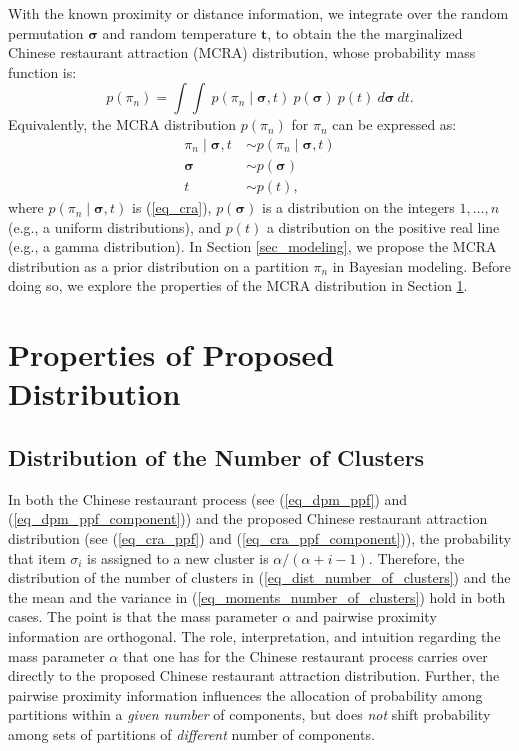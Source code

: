 \documentclass[lineno]{biometrika-dbd}
\newcommand{\partition}{\ensuremath{\pi}}
\newcommand{\mass}{\alpha}
\newcommand{\given}{\mid}
\begin{document}
With the known proximity or distance information, we integrate over the random
permutation $\bm{\sigma}$ and random temperature $\bm{t}$, to obtain the the
marginalized Chinese restaurant attraction (MCRA) distribution, whose
probability mass function is:
\begin{equation}
\label{eq_mcra}
p(\partition_n) = \int \int \ p(\partition_n \given \bm{\sigma}, t ) \ p(\bm{\sigma}) \ p(t) \ d \bm{\sigma} \ d t.
\end{equation}
Equivalently, the MCRA distribution $p(\partition_n)$ for $\partition_n$ can be expressed as: 
\begin{equation}
\label{eq_bnp_dpm}
\begin{split}
\partition_n \given \bm{\sigma}, t \ & \sim p(\partition_n \given \bm{\sigma}, t) \\
\bm{\sigma} & \sim p(\bm{\sigma}) \\
t & \sim p(t),
\end{split}
\end{equation}
where $p(\partition_n \mid \bm{\sigma}, t)$ is (\ref{eq_cra}), $p(\bm{\sigma})$
is a distribution on the integers $1,\ldots,n$ (e.g., a uniform distributions),
and $p(t)$ a distribution on the positive real line (e.g., a gamma
distribution).  In Section \ref{sec_modeling}, we propose the MCRA distribution
as a prior distribution on a partition $\partition_n$ in Bayesian modeling.
Before doing so, we explore the properties of the MCRA distribution in Section
\ref{sec_properties}.

\section{Properties of Proposed Distribution}
\label{sec_properties}

\subsection{Distribution of the Number of Clusters}
\label{sec_dist_number_of_clusters}

In both the Chinese restaurant process (see (\ref{eq_dpm_ppf}) and
(\ref{eq_dpm_ppf_component})) and the proposed Chinese restaurant attraction
distribution (see (\ref{eq_cra_ppf}) and (\ref{eq_cra_ppf_component})), the
probability that item $\sigma_i$ is assigned to a new cluster is $\mass / (
\mass + i - 1)$.  Therefore, the distribution of the number of clusters in
(\ref{eq_dist_number_of_clusters}) and the the mean and the variance in
(\ref{eq_moments_number_of_clusters}) hold in both cases.  The point is that
the mass parameter $\mass$ and pairwise proximity information are orthogonal.
The role, interpretation, and intuition regarding the mass parameter $\mass$
that one has for the Chinese restaurant process carries over directly to the
proposed Chinese restaurant attraction distribution.  Further, the pairwise
proximity information influences the allocation of probability among partitions
within a \emph{given number} of components, but does \emph{not} shift
probability among sets of partitions of \emph{different} number of components.
\end{document}
